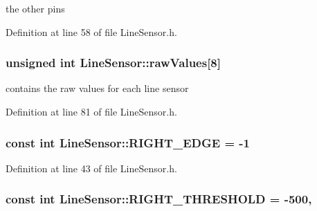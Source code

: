 the other pins 



Definition at line 58 of file Line\-Sensor.\-h.

\hypertarget{classLineSensor_ac60b7766a763cfc7378cb6b1387a7324}{
\subsubsection[{raw\-Values}]{\setlength{\rightskip}{0pt plus 5cm}unsigned int Line\-Sensor\-::raw\-Values\mbox{[}8\mbox{]}\hspace{0.3cm}{\ttfamily [private]}}}\label{classLineSensor_ac60b7766a763cfc7378cb6b1387a7324}


contains the raw values for each line sensor 



Definition at line 81 of file Line\-Sensor.\-h.

\hypertarget{classLineSensor_a729c00cce10a00a9cb6fcfc9c6904290}{
\subsubsection[{R\-I\-G\-H\-T\-\_\-\-E\-D\-G\-E}]{\setlength{\rightskip}{0pt plus 5cm}const int Line\-Sensor\-::\-R\-I\-G\-H\-T\-\_\-\-E\-D\-G\-E = -\/1\hspace{0.3cm}{\ttfamily [static]}}}\label{classLineSensor_a729c00cce10a00a9cb6fcfc9c6904290}


Definition at line 43 of file Line\-Sensor.\-h.

\hypertarget{classLineSensor_a8a78ded72775b1b248f9d9e60b352b49}{
\subsubsection[{R\-I\-G\-H\-T\-\_\-\-T\-H\-R\-E\-S\-H\-O\-L\-D}]{\setlength{\rightskip}{0pt plus 5cm}const int Line\-Sensor\-::\-R\-I\-G\-H\-T\-\_\-\-T\-H\-R\-E\-S\-H\-O\-L\-D = -\/500\hspace{0.3cm}{\ttfamily [static]}, {\ttfamily [private]}}}\label{classLineSensor_a8a78ded72775b1b248f9d9e60b352b49}


